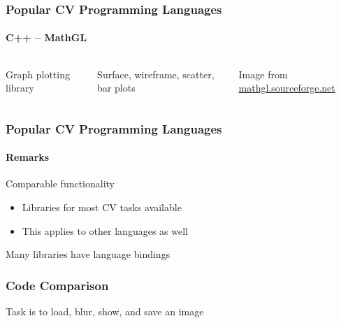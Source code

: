 \documentclass[xetex,professionalfont]{beamer}
\begin{document}

\begin{frame}
\frametitle{Popular CV Programming Languages}
\framesubtitle{C++ -- MathGL}

\begin{columns}

Graph plotting library

\medskip
Surface, wireframe, scatter, bar plots


\begin{center}
{
	{\centering Image from \url{mathgl.sourceforge.net}}}
\end{center}

\end{columns}

\end{frame}


\begin{frame}
\frametitle{Popular CV Programming Languages}
\framesubtitle{Remarks}

Comparable functionality
\begin{itemize}
	\item Libraries for most CV tasks available
	\item This applies to other languages as well
\end{itemize}

\medskip
Many libraries have language bindings

\end{frame}


\begin{frame}
\frametitle{Code Comparison}

Task is to load, blur, show, and save an image

\end{frame}
\end{document}

